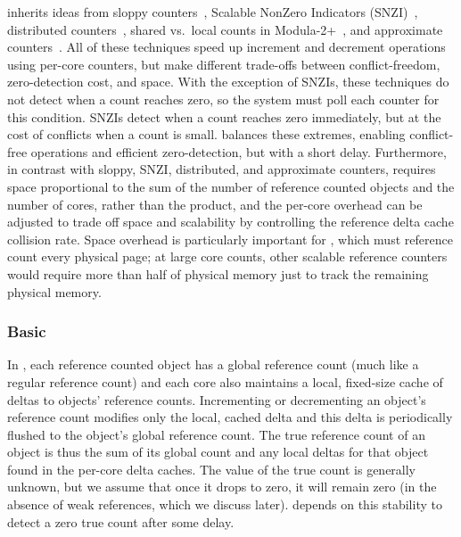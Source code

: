  inherits ideas from sloppy
counters~\cite{boyd-wickizer:scaling}, Scalable NonZero Indicators
(SNZI)~\cite{snzi:podc}, distributed counters~\cite{appavoo:k42},
shared vs.\ local counts in Modula-2+~\cite{detreville:concurrent-gc},
and approximate counters~\cite{approx:counter}.
%
All of these techniques speed up increment and decrement operations
using per-core counters, but make different trade-offs between
conflict-freedom, zero-detection cost, and space.  With the exception
of SNZIs, these techniques do not detect when a count reaches zero, so
the system must poll each counter for this condition.  SNZIs detect
when a count reaches zero immediately, but at the cost of conflicts
when a count is small.   balances these extremes, enabling
conflict-free operations and efficient zero-detection, but with a
short delay.
%
Furthermore, in contrast with sloppy, SNZI, distributed, and
approximate counters, 
requires space proportional to the sum of the number of reference
counted objects and the number of cores, rather than the product, and
the per-core overhead can be adjusted to trade off space and
scalability by controlling the reference delta cache collision rate.
%
Space overhead is particularly important for \vm, which must reference
count every physical page; at large core counts, other scalable
reference counters
would require more than half of physical memory just to track the
remaining physical memory.

\subsubsection{Basic }
In , each reference counted object has a global reference
count (much like a regular reference count) and each core also
maintains a local, fixed-size cache of deltas to objects' reference
counts.  Incrementing or decrementing an object's reference count
modifies only the local, cached delta and this delta is periodically
flushed to the object's global reference count.  The true reference
count of an object is thus the sum of its global count and any local
deltas for that object found in the per-core delta caches.  The value of the
true count is generally unknown, but we assume that once it drops to
zero, it will remain zero (in the absence of weak references, which
we discuss later).   depends on this stability to detect a
zero true count after some delay.

